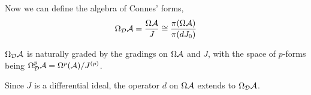 Now we can define the algebra of Connes' forms,
\begin{equation*}
    \Omega_{\mathcal{D}}\mathcal{A} = \frac{\Omega \mathcal{A}}{J} \cong \frac{\pi(\Omega \mathcal{A})}{\pi(dJ_0)}
\end{equation*}

$\Omega_{\mathcal{D}} \mathcal{A}$ is naturally graded by the gradings on $\Omega \mathcal{A}$ and $J$, with the 
space of $p$-forms being $\Omega^p_{\mathcal{D}} \mathcal{A} = \Omega^p(\mathcal{A})/J^{(p)}$.

Since $J$ is a differential ideal, the operator $d$ on $\Omega \mathcal{A}$
extends to $\Omega_{\mathcal{D}} \mathcal{A}$.  




